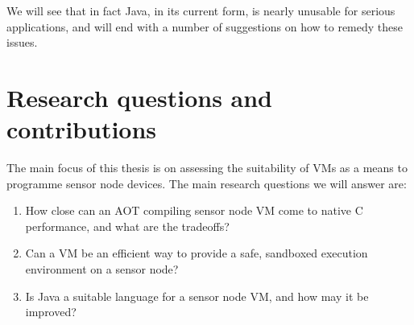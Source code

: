 We will see that in fact Java, in its current form, is nearly unusable for serious applications, and will end with a number of suggestions on how to remedy these issues.


\section{Research questions and contributions}
\label{sec-introduction-research-questions}
The main focus of this thesis is on assessing the suitability of VMs as a means to programme sensor node devices. The main research questions we will answer are:
\begin{enumerate}
	\item How close can an AOT compiling sensor node VM come to native C performance, and what are the tradeoffs?
	\item Can a VM be an efficient way to provide a safe, sandboxed execution environment on a sensor node?
	\item Is Java a suitable language for a sensor node VM, and how may it be improved?
\end{enumerate}

